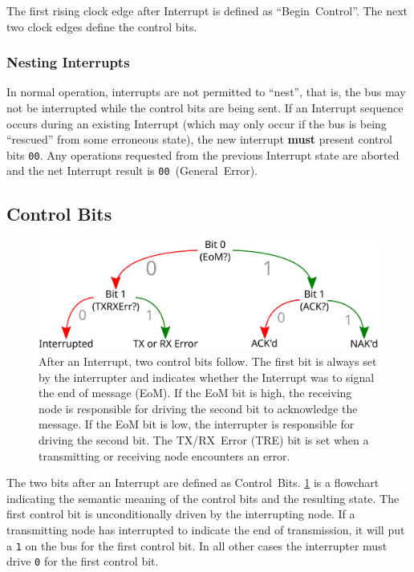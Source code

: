 The first rising clock edge after Interrupt is defined as ``Begin~Control''.
The next two clock edges define the control bits.

\subsubsection{Nesting Interrupts}
In normal operation, interrupts are not permitted to ``nest'', that is, the
bus may not be interrupted while the control bits are being sent. If an
Interrupt sequence occurs during an existing Interrupt (which may only occur
if the bus is being ``rescued'' from some erroneous state), the new interrupt
{\bf must} present control bits {\tt 00}. Any operations requested from the
previous Interrupt state are aborted and the net Interrupt result is
{\tt 00}~(General~Error).

\subsection{Control Bits}
\label{sec:protocol-control}

\begin{figure}
  \includegraphics[width=\linewidth]{img/control_bits}
  \caption{After an Interrupt, two control bits follow. The first bit is
    always set by the interrupter and indicates whether the Interrupt was to
    signal the end of message (EoM). If the EoM bit is high, the receiving
    node is responsible for driving the second bit to acknowledge the message.
    If the EoM bit is low, the interrupter is responsible for driving the
    second bit. The TX/RX~Error (TRE) bit is set when a transmitting or
    receiving node encounters an error.
  }
  \label{fig:control-bits}
\end{figure}

The two bits after an Interrupt are defined as Control~Bits.
\cref{fig:control-bits} is a flowchart indicating the semantic meaning
of the control bits and the resulting state. The first control bit is
unconditionally driven by the interrupting node. If a transmitting node has
interrupted to indicate the end of transmission, it will put a {\tt 1} on the
bus for the first control bit. In all other cases the interrupter must drive
{\tt 0} for the first control bit.


